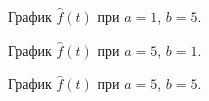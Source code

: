 \documentclass[a5paper, 10pt]{article}
\theoremstyle{definition}
\theoremstyle{plain}
\theoremstyle{remark}
\begin{document}
\begin{figure}[h!]
\caption{График $\hat{f}(t)$ при $a = 1$, $b = 5$.}
\caption{График $\hat{f}(t)$ при $a = 5$, $b = 1$.}
\end{figure}


\begin{figure}[h!]
\caption{График $\hat{f}(t)$ при $a = 5$, $b = 5$.}
\end{figure}
\end{document}
